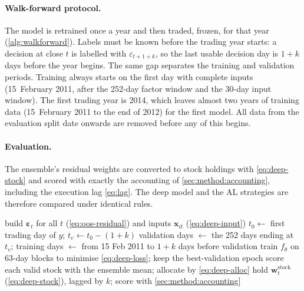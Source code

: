 \paragraph{Walk-forward protocol.}
The model is retrained once a year and then traded, frozen, for that year
(\cref{alg:walkforward}). Labels must be known before the trading year starts: a decision at
close $t$ is labelled with $\varepsilon_{t+1+k}$, so the last usable decision day is $1+k$ days
before the year begins. The same gap separates the training and validation periods. Training
always starts on the first day with complete inputs (15~February 2011, after the 252-day factor
window and the 30-day input window). The first trading year is 2014, which leaves almost two years
of training data (15~February 2011 to the end of 2012) for the first model. All data from the evaluation split date onwards are removed before any
of this begins.

\paragraph{Evaluation.}
The ensemble's residual weights are converted to stock holdings with \cref{eq:deep-stock} and
scored with exactly the accounting of \cref{sec:method:accounting}, including the execution lag
\cref{eq:lag}. The deep model and the AL strategies are therefore compared under identical rules.

\begin{algorithm}[ht]
\caption{Walk-forward training and trading of the deep model (execution lag $k$)}
\label{alg:walkforward}
\begin{algorithmic}[1]
\State build $\bm\varepsilon_{t}$ for all $t$ (\cref{eq:oos-residual}) and inputs $\bm x_{it}$ (\cref{eq:deep-input})
  \State $t_0 \gets$ first trading day of $y$; \quad $t_v \gets t_0 - (1+k)$ 
  \State validation days $\gets$ the 252 days ending at $t_v$; training days $\gets$ from 15 Feb 2011 to $1+k$ days before validation
    \State train $f_\theta$ on 63-day blocks to minimise \cref{eq:deep-loss}; keep the best-validation epoch
  \EndFor
    \State score each valid stock with the ensemble mean; allocate by \cref{eq:deep-alloc}
    \State hold $\bm w^{\text{stock}}_t$ (\cref{eq:deep-stock}), lagged by $k$; score with \cref{sec:method:accounting}
  \EndFor
\EndFor
\end{algorithmic}
\end{algorithm}
